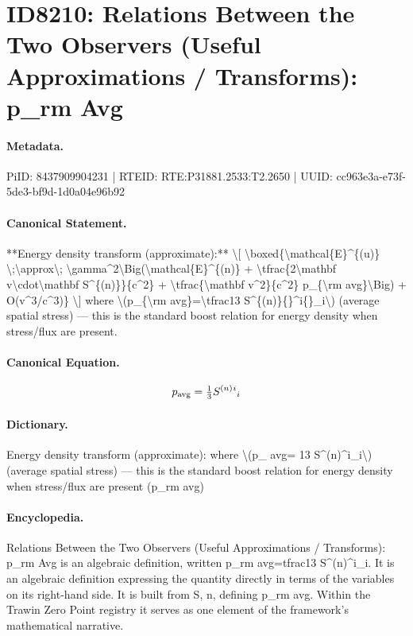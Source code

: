 \section*{ID8210: Relations Between the Two Observers (Useful Approximations / Transforms): p\_rm Avg}
\paragraph{Metadata.}
PiID: 8437909904231 | RTEID: RTE:P31881.2533:T2.2650 | UUID: cc963e3a-e73f-5de3-bf9d-1d0a04e96b92

\paragraph{Canonical Statement.}
**Energy density transform (approximate):** \textbackslash{}[ \textbackslash{}boxed\{\textbackslash{}mathcal\{E\}\textasciicircum{}\{(u)\} \textbackslash{};\textbackslash{}approx\textbackslash{}; \textbackslash{}gamma\textasciicircum{}2\textbackslash{}Big(\textbackslash{}mathcal\{E\}\textasciicircum{}\{(n)\} + \textbackslash{}tfrac\{2\textbackslash{}mathbf v\textbackslash{}cdot\textbackslash{}mathbf S\textasciicircum{}\{(n)\}\}\{c\textasciicircum{}2\} + \textbackslash{}tfrac\{\textbackslash{}mathbf v\textasciicircum{}2\}\{c\textasciicircum{}2\} p\_\{\textbackslash{}rm avg\}\textbackslash{}Big) + O(v\textasciicircum{}3/c\textasciicircum{}3)\} \textbackslash{}] where \textbackslash{}(p\_\{\textbackslash{}rm avg\}=\textbackslash{}tfrac13 S\textasciicircum{}\{(n)\}\{\}\textasciicircum{}i\{\}\_i\textbackslash{}) (average spatial stress) — this is the standard boost relation for energy density when stress/flux are present.

\paragraph{Canonical Equation.}
\[
p_{\rm avg}=\tfrac13 S^{(n)}{}^i{}_i
\]

\paragraph{Dictionary.}
Energy density transform (approximate): where \textbackslash{}(p\_ avg= 13 S\textasciicircum{}(n)\textasciicircum{}i\_i\textbackslash{}) (average spatial stress) — this is the standard boost relation for energy density when stress/flux are present (p\_rm avg)

\paragraph{Encyclopedia.}
Relations Between the Two Observers (Useful Approximations / Transforms): p\_rm Avg is an algebraic definition, written p\_rm avg=tfrac13 S\textasciicircum{}(n)\textasciicircum{}i\_i. It is an algebraic definition expressing the quantity directly in terms of the variables on its right-hand side. It is built from S, n, defining p\_rm avg. Within the Trawin Zero Point registry it serves as one element of the framework's mathematical narrative.
